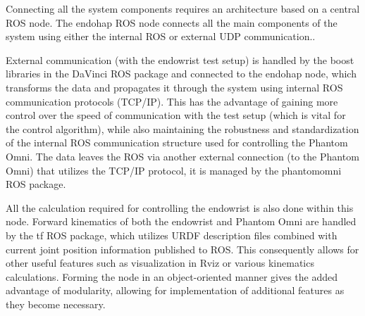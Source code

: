 	
\raggedbottom

Connecting all the system components requires an architecture based on a central ROS node.
The endohap ROS node connects all the main components of the system using either the internal ROS or external UDP communication..

External communication (with the endowrist test setup) is handled by the boost libraries in the DaVinci ROS package and connected to the endohap node, which transforms the data and propagates it through the system using internal ROS communication protocols (TCP/IP). 
This has the advantage of gaining more control over the speed of communication with the test setup (which is vital for the control algorithm), while also maintaining the robustness and standardization of the internal ROS communication structure used for controlling the Phantom Omni. The data leaves the ROS via another external connection (to the Phantom Omni) that utilizes the TCP/IP protocol, it is managed by the phantomomni ROS package.

All the calculation required for controlling the endowrist is also done within this node. Forward kinematics of both the endowrist and Phantom Omni are handled by the tf ROS package, which utilizes URDF description files combined with current joint position information published to ROS.
This consequently allows for other useful features such as visualization in Rviz or various kinematics calculations.
Forming the node in an object-oriented manner gives the added advantage of modularity, allowing for implementation of additional features as they become necessary. 




\appendix

\clearpage



